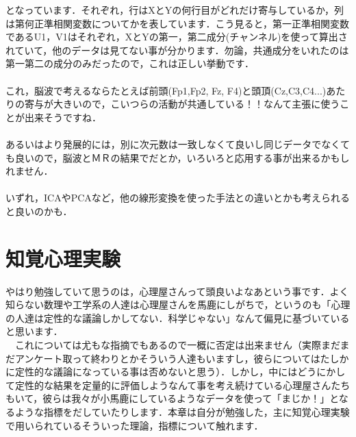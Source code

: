 \documentclass[11pt,a4paper,uplatex]{ujreport}
\begin{document}
となっています．それぞれ，行はXとYの何行目がどれだけ寄与しているか，列は第何正準相関変数についてかを表しています．こう見ると，第一正準相関変数であるU1，V1はそれぞれ，XとYの第一，第二成分(チャンネル)を使って算出されていて，他のデータは見てない事が分かります．勿論，共通成分をいれたのは第一第二の成分のみだったので，これは正しい挙動です．\\
\\

これ，脳波で考えるならたとえば前頭(Fp1,Fp2, Fz, F4)と頭頂(Cz,C3,C4...)あたりの寄与が大きいので，こいつらの活動が共通している！！なんて主張に使うことが出来そうですね．\\\\

あるいはより発展的には，別に次元数は一致しなくて良いし同じデータでなくても良いので，脳波とＭＲの結果でだとか，いろいろと応用する事が出来るかもしれません．\\\\

いずれ，ICAやPCAなど，他の線形変換を使った手法との違いとかも考えられると良いのかも．



\chapter{知覚心理実験}
やはり勉強していて思うのは，心理屋さんって頭良いよなあという事です．よく知らない数理や工学系の人達は心理屋さんを馬鹿にしがちで，というのも「心理の人達は定性的な議論しかしてない．科学じゃない」なんて偏見に基づいていると思います．\\
　これについては尤もな指摘でもあるので一概に否定は出来ません（実際まだまだアンケート取って終わりとかそういう人達もいますし，彼らについてはたしかに定性的な議論になっている事は否めないと思う）．しかし，中にはどうにかして定性的な結果を定量的に評価しようなんて事を考え続けている心理屋さんたちもいて，彼らは我々が小馬鹿にしているようなデータを使って「まじか！」となるような指標をだしていたりします．本章は自分が勉強した，主に知覚心理実験で用いられているそういった理論，指標について触れます．
\end{document}
